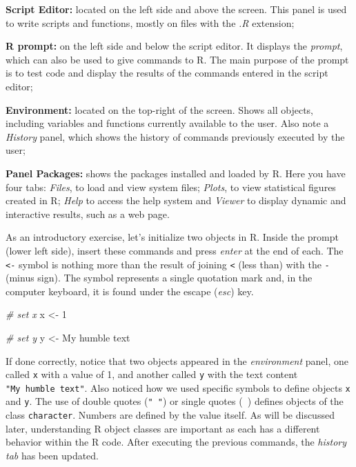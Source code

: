 \documentclass[
  12pt,
]{book}
\newenvironment{Shaded}{\begin{snugshade}}{\end{snugshade}}
\newcommand{\CommentTok}[1]{\textcolor[rgb]{0.37,0.37,0.37}{\textit{#1}}}
\newcommand{\DecValTok}[1]{\textcolor[rgb]{0.06,0.06,0.06}{#1}}
\newcommand{\NormalTok}[1]{#1}
\newcommand{\OtherTok}[1]{\textcolor[rgb]{0.37,0.37,0.37}{#1}}
\newcommand{\StringTok}[1]{\textcolor[rgb]{0.5,0.5,0.5}{#1}}
\begin{document}
\textbf{Script Editor:} located on the left side and above the screen. This panel is used to write scripts and functions, mostly on files with the \emph{.R} extension; 

\textbf{R prompt:} on the left side and below the script editor. It displays the \emph{prompt}, which can also be used to give commands to R. The main purpose of the prompt is to test code and display the results of the commands entered in the script editor; 

\textbf{Environment:} located on the top-right of the screen. Shows all objects, including variables and functions currently available to the user. Also note a \emph{History} panel, which shows the history of commands previously executed by the user; 

\textbf{Panel Packages:} shows the packages installed and loaded by R. Here you have four tabs: \emph{Files}, to load and view system files; \emph{Plots}, to view statistical figures created in R; \emph{Help} to access the help system and \emph{Viewer} to display dynamic and interactive results, such as a web page. 

As an introductory exercise, let's initialize two objects in R. Inside the prompt (lower left side), insert these commands and press \emph{enter} at the end of each. The \texttt{\textless{}-} symbol is nothing more than the result of joining \texttt{\textless{}} (less than) with the \texttt{-} (minus sign). The \texttt{\textquotesingle{}} symbol represents a single quotation mark and, in the computer keyboard, it is found under the escape (\emph{esc}) key.

\begin{Shaded}
\begin{Highlighting}[]
\CommentTok{\# set x}
\NormalTok{x }\OtherTok{\textless{}{-}} \DecValTok{1}

\CommentTok{\# set y}
\NormalTok{y }\OtherTok{\textless{}{-}} \StringTok{\textquotesingle{}My humble text\textquotesingle{}}
\end{Highlighting}
\end{Shaded}

If done correctly, notice that two objects appeared in the \emph{environment} panel, one called \texttt{x} with a value of 1, and another called \texttt{y} with the text content \texttt{"My\ humble\ text"}. Also noticed how we used specific symbols to define objects \texttt{x} and \texttt{y}. The use of double quotes (\texttt{"\ "}) or single quotes (\texttt{\textquotesingle{}\ \textquotesingle{}}) defines objects of the class \texttt{character}. Numbers are defined by the value itself. As will be discussed later, understanding R object classes are important as each has a different behavior within the R code. After executing the previous commands, the \emph{history tab} has been updated.
\end{document}
